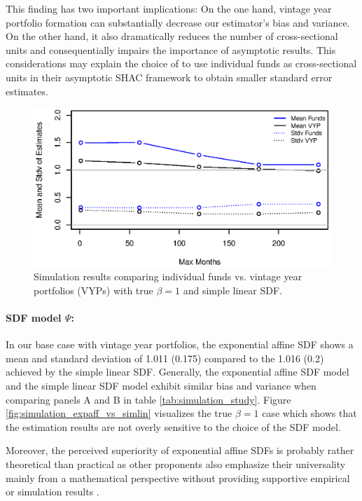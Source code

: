 \documentclass[12pt]{article}
\begin{document}
This finding has two important implications:
On the one hand, vintage year portfolio formation can substantially decrease our estimator's bias and variance.
On the other hand, it also dramatically reduces the number of cross-sectional units and consequentially impairs the importance of asymptotic results.
This considerations may explain the choice of \cite{KN16} to use individual funds as cross-sectional units in their asymptotic SHAC framework to obtain smaller standard error estimates.

\begin{figure}
	\centering
	\includegraphics{eps/Simulationfundsvsvyps}
	\caption{Simulation results comparing individual funds vs. vintage year portfolios (VYPs) with true $\beta=1$ and simple linear SDF.}
	\label{fig:simulation_funds_vs_vyps}
\end{figure}


\paragraph{SDF model $\Psi$:}
In our base case with vintage year portfolios, the exponential affine SDF shows a mean and standard deviation of 1.011 (0.175) compared to the 1.016 (0.2) achieved by the simple linear SDF.
Generally, the exponential affine SDF model and the simple linear SDF model exhibit similar bias and variance when comparing panels A and B in table \ref{tab:simulation_study}.
Figure \ref{fig:simulation_expaff_vs_simlin} visualizes the true $\beta=1$ case which shows that the estimation results are not overly sensitive to the choice of the SDF model.

Moreover, the perceived superiority of exponential affine SDFs is probably rather theoretical than practical as other proponents also emphasize their universality mainly from a mathematical perspective without providing supportive empirical or simulation results \citep{GM07,BMP08}.
\end{document}
